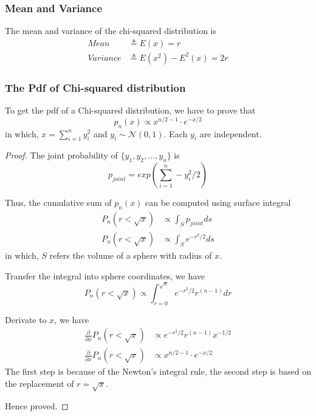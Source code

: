 \subsubsection{Mean and Variance}

The mean and variance of the chi-squared distribution is
\begin{align*}
    Mean     & \triangleq E(x) = r             \\
    Variance & \triangleq E(x^2) - E^2(x) = 2r
\end{align*}

\subsubsection{The Pdf of Chi-squared distribution}
\begin{lemma}
    \label{lemma: Compute the pdf of Chi-squared distribution}
    To get the pdf of a Chi-squared distribution, we have to prove that
    \begin{equation*}
        p_{n}(x) \propto x^{n/2-1} \cdot e^{-x/2}
    \end{equation*}
    in which, $x = \sum_{i=1}^{n} y_i^2$ and $y_i \sim \mathcal{N}(0, 1)$.
    Each $y_i$ are independent.

\end{lemma}

\begin{proof}
    The joint probability of $\{y_1, y_2, \dots, y_n\}$ is
    \begin{equation*}
        p_{joint} = exp(\sum_{i=1}^{n}-y_i^2/2)
    \end{equation*}

    Thus, the cumulative sum of $p_n(x)$ can be computed using surface integral
    \begin{align*}
        P_n(r<\sqrt{x}) & \propto \int_{S} p_{joint} ds  \\
        P_n(r<\sqrt{x}) & \propto \int_{S} e^{-r^2/2} ds
    \end{align*}
    in which, $S$ refers the volume of a sphere with radius of $x$.

    Transfer the integral into sphere coordinates, we have
    \begin{equation*}
        P_n(r<\sqrt{x}) \propto \int_{r=0}^{\sqrt{x}} e^{-r^2/2} r^{(n-1)} dr
    \end{equation*}

    Derivate to $x$, we have
    \begin{align*}
        \frac{\partial}{\partial{x}} {P_n(r<\sqrt{x})} & \propto e^{-r^2/2} r^{(n-1)} x^{-1/2} \\
        \frac{\partial}{\partial{x}} {P_n(r<\sqrt{x})} & \propto x^{n/2-1} \cdot e^{-x/2}
    \end{align*}
    The first step is because of the Newton's integral rule, the second step is based on the replacement of $r = \sqrt{x}$.

    Hence proved.

\end{proof}

